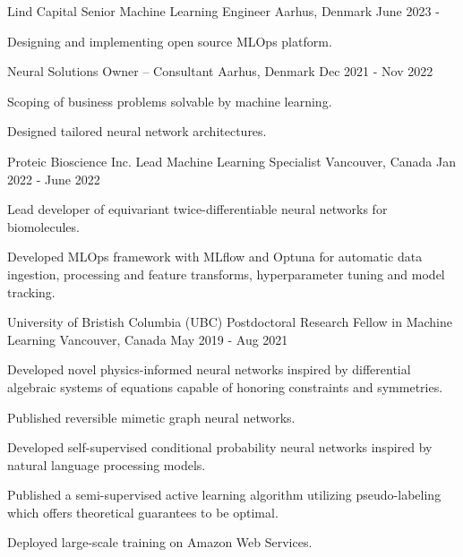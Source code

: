 \begin{cventries}
\vspace{5mm}

  \cventry
  {Lind Capital} %
  {Senior Machine Learning Engineer} %
    {Aarhus, Denmark} %
    {June 2023 - } %
    {
      \begin{cvitems} %
        \item {Designing and implementing open source MLOps platform.}
      \end{cvitems}
    }


  \cventry
  {Neural Solutions} %
  {Owner -- Consultant} %
    {Aarhus, Denmark} %
    {Dec 2021 - Nov 2022} %
    {
      \begin{cvitems} %
        \item {Scoping of business problems solvable by machine learning.}
        \item {Designed tailored neural network architectures.}
      \end{cvitems}
    }


  \cventry
  {Proteic Bioscience Inc.} %
  {Lead Machine Learning Specialist} %
    {Vancouver, Canada} %
    {Jan 2022 - June 2022} %
    {
      \begin{cvitems} %
        \item {Lead developer of equivariant twice-differentiable neural networks for biomolecules.}
        \item {Developed MLOps framework with MLflow and Optuna for automatic data ingestion, processing and feature transforms, hyperparameter tuning and model tracking.}
      \end{cvitems}
    }

  \cventry
  {University of Bristish Columbia (UBC)} %
  {Postdoctoral Research Fellow in Machine Learning} %
    {Vancouver, Canada} %
    {May 2019 - Aug 2021} %
    {
      \begin{cvitems} %
        \item {Developed novel physics-informed neural networks inspired by differential algebraic systems of equations capable of honoring constraints and symmetries.}
        \item {Published reversible mimetic graph neural networks.}
        \item {Developed self-supervised conditional probability neural networks inspired by natural language processing models.}
        \item {Published a semi-supervised active learning algorithm utilizing pseudo-labeling which offers theoretical guarantees to be optimal.}
        \item {Deployed large-scale training on Amazon Web Services.}
      \end{cvitems}
    }


\end{cventries}
